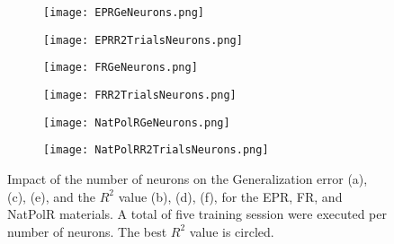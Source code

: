 \begin{figure}[htbp!]
	\centering
    \begin{subfigure}[b]{0.49\textwidth}
        \centering
        \texttt{[image: EPRGeNeurons.png]}
        \caption{}
        \label{fig:GenNeuronsEPR}
    \end{subfigure}
    \begin{subfigure}[b]{0.49\textwidth}
        \centering
        \texttt{[image: EPRR2TrialsNeurons.png]}
        \caption{}
        \label{fig:TrialsNeuronsEPR}
    \end{subfigure}
    \begin{subfigure}[b]{0.49\textwidth}
        \centering
        \texttt{[image: FRGeNeurons.png]}
        \caption{}
        \label{fig:GenNeuronsFR}
    \end{subfigure}
    \begin{subfigure}[b]{0.49\textwidth}
        \centering
        \texttt{[image: FRR2TrialsNeurons.png]}
        \caption{}
        \label{fig:TrialsNeuronsFR}
    \end{subfigure}
    \begin{subfigure}[b]{0.49\textwidth}
        \centering
        \texttt{[image: NatPolRGeNeurons.png]}
        \caption{}
        \label{fig:GenNeuronsNatPolR}
    \end{subfigure}
    \begin{subfigure}[b]{0.49\textwidth}
        \centering
        \texttt{[image: NatPolRR2TrialsNeurons.png]}
        \caption{}
        \label{fig:TrialsNeuronsNatPolR}
    \end{subfigure}
    \caption{Impact of the number of neurons on the Generalization error (a), (c), (e), and the $R^2$ value (b), (d), (f), for the EPR, FR, and NatPolR materials. A total of five training session were executed per number of neurons. The best $R^2$ value is circled.}
    \label{fig:TrialsNeurons1}
\end{figure}

